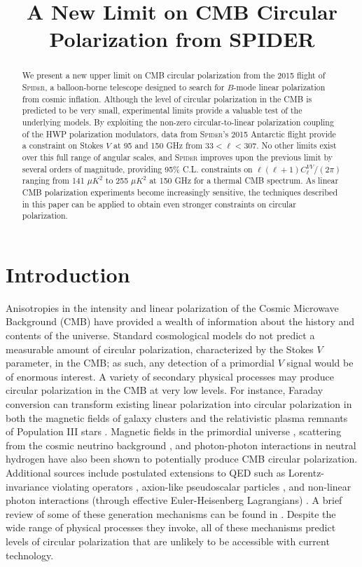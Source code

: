 \documentclass[twocolumn]{aastex61}
\begin{document}
\title{A New Limit on CMB Circular Polarization from SPIDER}




\begin{abstract}
We present a new upper limit on CMB circular polarization from the 2015 flight of \textsc{Spider}, a balloon-borne telescope designed to search for $B$-mode linear polarization from cosmic inflation. Although the level of circular polarization in the CMB is predicted to be very small, experimental limits provide a valuable test of the underlying models. By exploiting the non-zero circular-to-linear polarization coupling of the HWP polarization modulators, data from \textsc{Spider}'s 2015 Antarctic flight provide a constraint on Stokes $V$ at 95 and 150 GHz from $33<\ell<307$. No other limits exist over this full range of angular scales, and \textsc{Spider} improves upon the previous limit by several orders of magnitude, providing 95\% C.L. constraints on $\ell (\ell+1)C_{\ell}^{VV}/(2\pi)$ ranging from 141 $\mu K ^2$ to 255 $\mu K ^2$ at 150 GHz for a thermal CMB spectrum. As linear CMB polarization experiments become increasingly sensitive, the techniques described in this paper can be applied to obtain even stronger constraints on circular polarization.
\end{abstract}

\section{Introduction}
\label{sec:intro}
Anisotropies in the intensity and linear polarization of the Cosmic Microwave Background (CMB) have provided a wealth of information about the history and contents of the universe.  Standard cosmological models do not predict a measurable amount of circular polarization, characterized by the Stokes $V$ parameter, in the CMB;  as such, any detection of a primordial $V$ signal would be of enormous interest.   A variety of secondary physical processes may produce circular polarization in the CMB at very low levels. For instance, Faraday conversion can transform existing linear polarization into circular polarization in both the magnetic fields of galaxy clusters \citep{galaxy_faraday} and the relativistic plasma remnants of Population III stars \citep{pop3_stars}.  Magnetic fields in the primordial universe \citep{giovannini_primordial, zarei_primordial}, scattering from the cosmic neutrino background \citep{CvB}, and photon-photon interactions in neutral hydrogen \citep{photon_photon} have also been shown to potentially produce CMB circular polarization. Additional sources include postulated extensions to QED such as Lorentz-invariance violating operators \citep{QED2a, QED2b}, axion-like pseudoscalar particles \citep{axions}, and non-linear photon interactions (through effective Euler-Heisenberg Lagrangians) \citep{QED1}.  A brief review of some of these generation mechanisms can be found in \citet{Lubin_review}.  Despite the wide range of physical processes they invoke, all of these mechanisms predict levels of circular polarization that are unlikely to be accessible with current technology.
\end{document}
